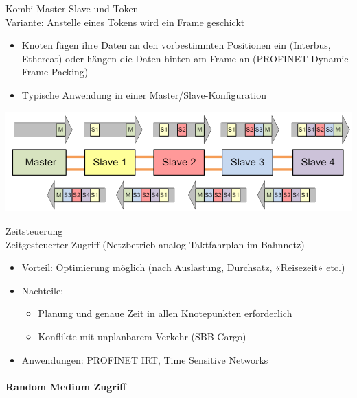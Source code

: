 \begin{concept}{Kombi Master-Slave und Token}\\
    Variante: Anstelle eines Tokens wird ein Frame geschickt
    \begin{itemize}
        \item Knoten fügen ihre Daten an den vorbestimmten Positionen ein (Interbus, Ethercat) oder hängen die Daten hinten am Frame an (PROFINET Dynamic Frame Packing)
        \item Typische Anwendung in einer Master/Slave-Konfiguration
    \end{itemize}
        \includegraphics[width=0.75\linewidth]{images/combo_master_slave_token.png}
\end{concept}

\begin{definition}{Zeitsteuerung}\\
    Zeitgesteuerter Zugriff (Netzbetrieb analog Taktfahrplan im Bahnnetz)
    \begin{itemize}
        \item Vorteil: Optimierung möglich (nach Auslastung, Durchsatz, «Reisezeit» etc.)
        \item Nachteile:
        \begin{itemize}
            \item Planung und genaue Zeit in allen Knotepunkten erforderlich
            \item Konflikte mit unplanbarem Verkehr (SBB Cargo)
        \end{itemize}
        \item Anwendungen: PROFINET IRT, Time Sensitive Networks
    \end{itemize}
\end{definition}

\paragraph{Random Medium Zugriff}

